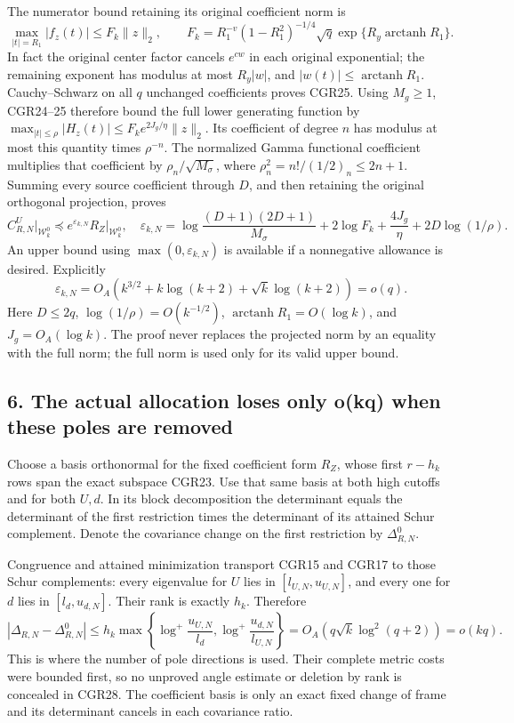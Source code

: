 The numerator bound retaining its original coefficient norm is \[
\max_{|t|=R_1}|f_z(t)|
\le F_k\|z\|_2,\qquad
F_k=R_1^{-v}(1-R_1^2)^{-1/4}\sqrt q
\exp\{R_y\operatorname{arctanh}R_1\}.
\tag{CGR25}
\] In fact the original center factor cancels \(e^{cw}\) in each original exponential; the remaining exponent has modulus at most \(R_y|w|\), and \(|w(t)|\le\operatorname{arctanh}R_1\). Cauchy--Schwarz on all \(q\) unchanged coefficients proves CGR25. Using \(M_g\ge1\), CGR24--25 therefore bound the full lower generating function by \(\max_{|t|\le\rho}|H_z(t)|\le F_ke^{2J_g/\eta}\|z\|_2\). Its coefficient of degree \(n\) has modulus at most this quantity times \(\rho^{-n}\). The normalized Gamma functional coefficient multiplies that coefficient by \(\rho_n/\sqrt{M_\sigma}\), where \(\rho_n^2=n!/(1/2)_n\le2n+1\). Summing every source coefficient through \(D\), and then retaining the original orthogonal projection, proves \[
\boxed{C_{R,N}^U\big|_{\mathcal W_k^0}
\preceq e^{\varepsilon_{k,N}}R_Z\big|_{\mathcal W_k^0},}
\quad
\varepsilon_{k,N}=
\log\frac{(D+1)(2D+1)}{M_\sigma}+2\log F_k
+\frac{4J_g}{\eta}+2D\log(1/\rho).
\tag{CGR26}
\] An upper bound using \(\max(0,\varepsilon_{k,N})\) is available if a nonnegative allowance is desired. Explicitly \[
\varepsilon_{k,N}
=O_A(k^{3/2}+k\log(k+2)+\sqrt{k}\log(k+2))=o(q).
\tag{CGR27}
\] Here \(D\le2q\), \(\log(1/\rho)=O(k^{-1/2})\), \(\operatorname{arctanh}R_1=O(\log k)\), and \(J_g=O_A(\log k)\). The proof never replaces the projected norm by an equality with the full norm; the full norm is used only for its valid upper bound.

\subsection{6. The actual allocation loses only o(kq) when these poles are removed}\label{the-actual-allocation-loses-only-okq-when-these-poles-are-removed}

Choose a basis orthonormal for the fixed coefficient form \(R_Z\), whose first \(r-h_k\) rows span the exact subspace CGR23. Use that same basis at both high cutoffs and for both \(U,d\). In its block decomposition the determinant equals the determinant of the first restriction times the determinant of its attained Schur complement. Denote the covariance change on the first restriction by \(\Delta_{R,N}^0\).

Congruence and attained minimization transport CGR15 and CGR17 to those Schur complements: every eigenvalue for \(U\) lies in \([l_{U,N},u_{U,N}]\), and every one for \(d\) lies in \([l_d,u_{d,N}]\). Their rank is exactly \(h_k\). Therefore \[
\boxed{|\Delta_{R,N}-\Delta_{R,N}^0|
\le h_k\max\left\{
\log^+\frac{u_{U,N}}{l_d},
\log^+\frac{u_{d,N}}{l_{U,N}}\right\}
=O_A(q\sqrt{k}\log^2(q+2))=o(kq).}
\tag{CGR28}
\] This is where the number of pole directions is used. Their complete metric costs were bounded first, so no unproved angle estimate or deletion by rank is concealed in CGR28. The coefficient basis is only an exact fixed change of frame and its determinant cancels in each covariance ratio.

